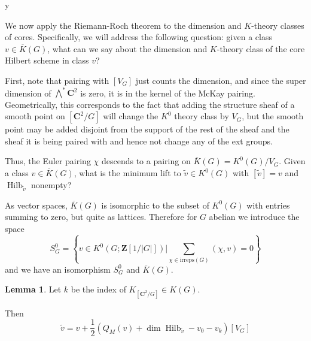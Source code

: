 y\documentclass{amsart}[12pt]
\theoremstyle{definition}
\newtheorem{lemma}[dummy]{Lemma}
\newcommand{\Z}{\mathbf{Z}}
\newcommand{\C}{\mathbf{C}}
\newcommand{\irreps}{\text{irreps}}
\DeclareMathOperator{\Hilb}{Hilb}
\begin{document}
We now apply the Riemann-Roch theorem to the dimension and $K$-theory classes of cores.  Specifically, we will address the following question: given a class $v\in \overline{K}(G)$, what can we say about the dimension and $K$-theory class of the core Hilbert scheme in class $v$?

First, note that pairing with $[V_G]$ just counts the dimension, and since the super dimension of $\bigwedge^*\C^2$ is zero, it is in the kernel of the McKay pairing.  Geometrically, this corresponds to the fact that adding the structure sheaf of a smooth point on $[\C^2/G]$ will change the $K^0$ theory class by $V_G$, but the smooth point may be added disjoint from the support of the rest of the sheaf and the sheaf it is being paired with and hence not change any of the ext groups.


Thus, the Euler pairing $\chi$ descends to a pairing on $\overline{K}(G)=K^0(G)/V_G$.  Given a class $v\in \overline{K}(G)$, what is the minimum lift to $\tilde{v}\in K^0(G)$ with $[\tilde{v}]=v$ and $\Hilb_{\tilde{v}}$ nonempty?

As vector spaces, $\overline{K}(G)$ is isomorphic to the subset of $K^0(G)$ with entries summing to zero, but quite as lattices.  Therefore for $G$ abelian we introduce the space 
$$S^0_G=\left\{v\in K^0(G; \Z[1/|G|])\Bigg | \sum_{\chi\in\irreps(G)}(\chi, v)=0\right\}$$
and we have an isomorphism $S^0_G$ and $\overline{K}(G)$.  


\begin{lemma}
Let $k$ be the index of $K_{[\C^2/G]}\in K(G)$.

Then
$$\tilde{v}=v+\frac{1}{2}\left(Q_M(v)+\dim\Hilb_{\tilde{v}} -v_0-v_{k}\right)[V_G]$$
\end{lemma}
\end{document}
